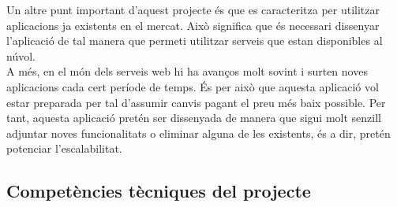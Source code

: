 Un altre punt important d’aquest projecte és que es caracteritza per utilitzar aplicacions ja existents en el mercat. Això significa que és necessari dissenyar l’aplicació de tal manera que permeti utilitzar serveis que estan disponibles al núvol.\\

A més, en el món dels serveis web hi ha avanços molt sovint i surten noves
aplicacions cada cert període de temps. És per això que aquesta aplicació vol estar preparada per tal d’assumir canvis pagant el preu més baix possible. Per tant, aquesta aplicació pretén ser dissenyada de manera que sigui molt senzill adjuntar noves funcionalitats o eliminar alguna de les existents, és a dir, pretén potenciar l’escalabilitat.

\subsection{Competències tècniques del projecte}
